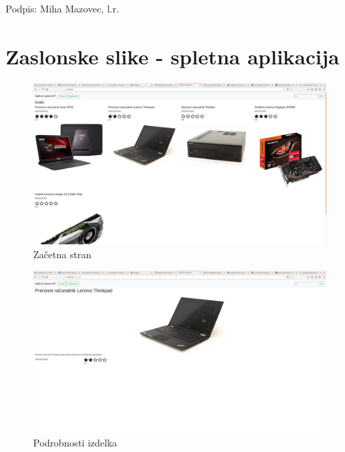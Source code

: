 \documentclass[a4paper,12pt]{report}
\newcommand{\drugiavtor} {Miha Mazovec}
\begin{document}
Podpis: {\drugiavtor}, l.r.

\newpage

\chapter{Zaslonske slike - spletna aplikacija}

\begin{figure}[h]
    \centering
    \includegraphics[width=\linewidth]{slike/splet/first_page.png}
    \caption{Začetna stran}
    \label{fig:first_page}
\end{figure}

\begin{figure}[h]
    \centering
    \includegraphics[width=\linewidth]{slike/splet/product_detail.png}
    \caption{Podrobnosti izdelka}
    \label{fig:product_details}
\end{figure}
\end{document}
